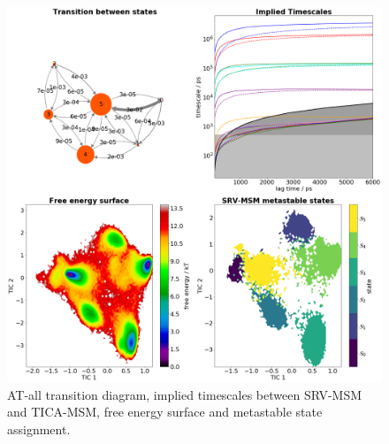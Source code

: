 \documentclass[journal=jpcbfk,manuscript=article]{achemso}
\begin{document}
\begin{figure}[ht!]
	\begin{center}
        \includegraphics[width=\textwidth]{Figs/skeleton/AT-all_vis.png}
        \caption{AT-all transition diagram, implied timescales between SRV-MSM and TICA-MSM, free energy surface and metastable state assignment.}
        \label{fig:sample_fray}
	\end{center}
\end{figure}
\end{document}
